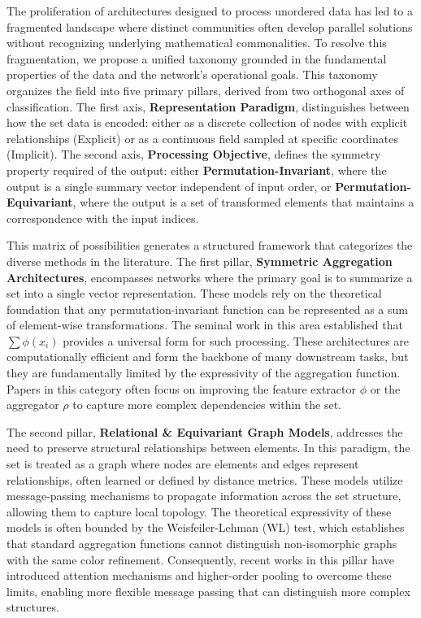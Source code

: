 \documentclass{article}
\begin{document}
The proliferation of architectures designed to process unordered data has led to a fragmented landscape where distinct communities often develop parallel solutions without recognizing underlying mathematical commonalities. To resolve this fragmentation, we propose a unified taxonomy grounded in the fundamental properties of the data and the network's operational goals. This taxonomy organizes the field into five primary pillars, derived from two orthogonal axes of classification. The first axis, \textbf{Representation Paradigm}, distinguishes between how the set data is encoded: either as a discrete collection of nodes with explicit relationships (Explicit) or as a continuous field sampled at specific coordinates (Implicit). The second axis, \textbf{Processing Objective}, defines the symmetry property required of the output: either \textbf{Permutation-Invariant}, where the output is a single summary vector independent of input order, or \textbf{Permutation-Equivariant}, where the output is a set of transformed elements that maintains a correspondence with the input indices.

This matrix of possibilities generates a structured framework that categorizes the diverse methods in the literature. The first pillar, \textbf{Symmetric Aggregation Architectures}, encompasses networks where the primary goal is to summarize a set into a single vector representation. These models rely on the theoretical foundation that any permutation-invariant function can be represented as a sum of element-wise transformations. The seminal work in this area established that $\sum \phi(x_i)$ provides a universal form for such processing. These architectures are computationally efficient and form the backbone of many downstream tasks, but they are fundamentally limited by the expressivity of the aggregation function. Papers in this category often focus on improving the feature extractor $\phi$ or the aggregator $\rho$ to capture more complex dependencies within the set.

The second pillar, \textbf{Relational \& Equivariant Graph Models}, addresses the need to preserve structural relationships between elements. In this paradigm, the set is treated as a graph where nodes are elements and edges represent relationships, often learned or defined by distance metrics. These models utilize message-passing mechanisms to propagate information across the set structure, allowing them to capture local topology. The theoretical expressivity of these models is often bounded by the Weisfeiler-Lehman (WL) test, which establishes that standard aggregation functions cannot distinguish non-isomorphic graphs with the same color refinement. Consequently, recent works in this pillar have introduced attention mechanisms and higher-order pooling to overcome these limits, enabling more flexible message passing that can distinguish more complex structures.
\end{document}
